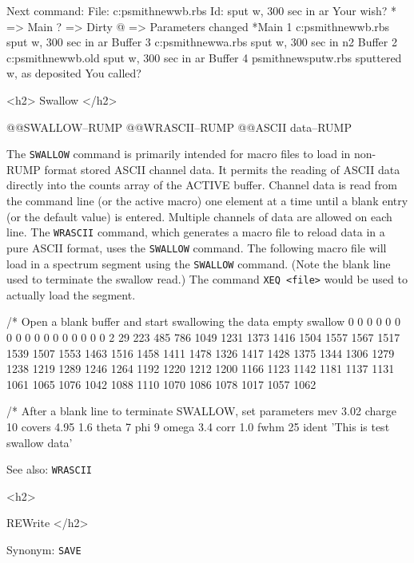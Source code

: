 {\medskip\beginscreen
Next command: 
File: c:{\bs}psmith{\bs}new{\bs}wb.rbs
Id:   sput w, 300 sec in ar
Your wish? 
* => Main    ? => Dirty    @ => Parameters changed
 *Main    1    c:{\bs}psmith{\bs}new{\bs}wb.rbs  sput w, 300 sec in ar
  Buffer  3    c:{\bs}psmith{\bs}new{\bs}wa.rbs  sput w, 300 sec in n2
  Buffer  2    c:{\bs}psmith{\bs}new{\bs}wb.old  sput w, 300 sec in ar
  Buffer  4    psmith{\bs}new{\bs}sputw.rbs  sputtered w, as deposited
You called? 
\endscreen

<h2> Swallow </h2>


@@{SWALLOW--RUMP} @@{WRASCII--RUMP} @@{ASCII data--RUMP}

The {\tt SWALLOW} command is primarily intended for macro files to load in
non-RUMP format stored ASCII channel data.  It permits the reading of ASCII
data directly into the counts array of the ACTIVE buffer.  Channel data is
read from the command line (or the active macro) one element at a time until a
blank entry (or the default value) is entered.  Multiple channels of data are
allowed on each line.  The {\tt WRASCII} command, which generates a macro file
to reload data in a pure ASCII format, uses the {\tt SWALLOW} command.  The
following macro file will load in a spectrum segment using the {\tt SWALLOW}
command.  (Note the blank line used to terminate the swallow read.)  The
command {\tt XEQ <file>} would be used to actually load the segment.

\medskip\beginscreen
/* Open a blank buffer and start swallowing the data
empty swallow
   0    0    0    0    0    0    0    0    0    0    0    0
   0    0    0    0    0    2   29  223  485  786 1049 1231
1373 1416 1504 1557 1567 1517 1539 1507 1553 1463 1516 1458
1411 1478 1326 1417 1428 1375 1344 1306 1279 1238 1219 1289
1246 1264 1192 1220 1212 1200 1166 1123 1142 1181 1137 1131
1061 1065 1076 1042 1088 1110 1070 1086 1078 1017 1057 1062

/* After a blank line to terminate SWALLOW, set parameters
mev  3.02 charge 10 covers 4.95 1.6 theta 7 phi 9 omega 3.4
corr 1.0  fwhm 25 ident 'This is test swallow data'
\endscreen

See also: {\tt WRASCII}

<h2> {REWrite </h2>


Synonym:  {\tt SAVE}

}}
